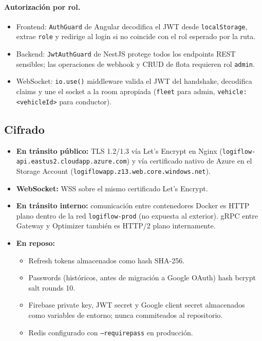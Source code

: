 \documentclass[12pt,a4paper,oneside]{article}
\begin{document}
\paragraph{Autorizaci\'on por rol.}
\begin{itemize}[leftmargin=*]
  \item Frontend: \texttt{AuthGuard} de Angular decodifica el JWT desde \texttt{localStorage}, extrae \texttt{role} y redirige al login si no coincide con el rol esperado por la ruta.
  \item Backend: \texttt{JwtAuthGuard} de NestJS protege todos los endpoints REST sensibles; las operaciones de webhook y CRUD de flota requieren rol \texttt{admin}.
  \item WebSocket: \texttt{io.use()} middleware valida el JWT del handshake, decodifica claims y une el socket a la room apropiada (\texttt{fleet} para admin, \texttt{vehicle:<vehicleId>} para conductor).
\end{itemize}

\subsection{Cifrado}

\begin{itemize}[leftmargin=*]
  \item \textbf{En tr\'ansito p\'ublico:} TLS 1.2/1.3 v\'ia Let's Encrypt en Nginx (\texttt{logiflow-api.eastus2.cloudapp.azure.com}) y v\'ia certificado nativo de Azure en el Storage Account (\texttt{logiflowapp.z13.web.core.windows.net}).
  \item \textbf{WebSocket:} WSS sobre el mismo certificado Let's Encrypt.
  \item \textbf{En tr\'ansito interno:} comunicaci\'on entre contenedores Docker es HTTP plano dentro de la red \texttt{logiflow-prod} (no expuesta al exterior). gRPC entre Gateway y Optimizer tambi\'en es HTTP/2 plano internamente.
  \item \textbf{En reposo:}
  \begin{itemize}
    \item Refresh tokens almacenados como hash SHA-256.
    \item Passwords (hist\'oricos, antes de migraci\'on a Google OAuth) hash bcrypt salt rounds 10.
    \item Firebase private key, JWT secret y Google client secret almacenados como variables de entorno; nunca commiteados al repositorio.
    \item Redis configurado con \texttt{--requirepass} en producci\'on.
  \end{itemize}
\end{itemize}
\end{document}
